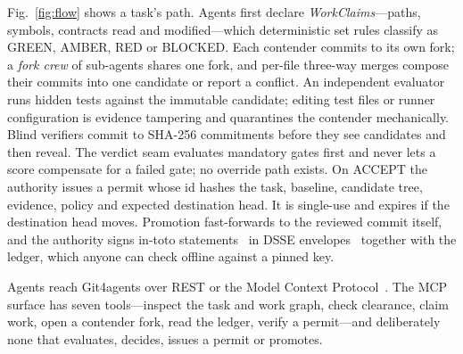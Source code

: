 \documentclass[10pt,conference]{IEEEtran}
\newcommand{\tool}{Git4agents}
\begin{document}
Fig.~\ref{fig:flow} shows a task's path. Agents first declare \emph{WorkClaims}---paths, symbols, contracts read and modified---which deterministic set rules classify as GREEN, AMBER, RED or BLOCKED. Each contender commits to its own fork; a \emph{fork crew} of sub-agents shares one fork, and per-file three-way merges compose their commits into one candidate or report a conflict. An independent evaluator runs hidden tests against the immutable candidate; editing test files or runner configuration is evidence tampering and quarantines the contender mechanically. Blind verifiers commit to SHA-256 commitments before they see candidates and then reveal. The verdict seam evaluates mandatory gates first and never lets a score compensate for a failed gate; no override path exists. On ACCEPT the authority issues a permit whose id hashes the task, baseline, candidate tree, evidence, policy and expected destination head. It is single-use and expires if the destination head moves. Promotion fast-forwards to the reviewed commit itself, and the authority signs in-toto statements~\cite{torresarias2019intoto} in DSSE envelopes~\cite{dsse} together with the ledger, which anyone can check offline against a pinned key.

Agents reach \tool{} over REST or the Model Context Protocol~\cite{mcp}. The MCP surface has seven tools---inspect the task and work graph, check clearance, claim work, open a contender fork, read the ledger, verify a permit---and deliberately none that evaluates, decides, issues a permit or promotes.
\end{document}

